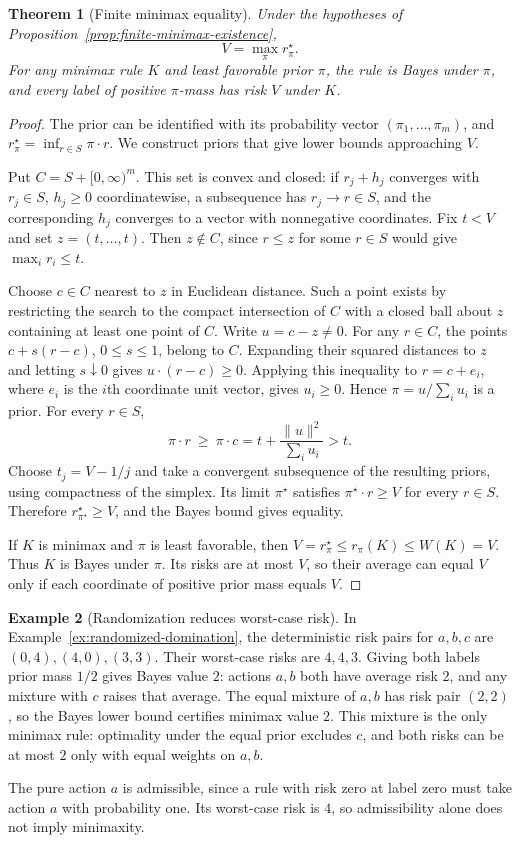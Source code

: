 \documentclass[11pt,oneside]{book}
\newtheorem{theorem}{Theorem}[chapter]
\theoremstyle{definition}
\newtheorem{example}[theorem]{Example}
\theoremstyle{remark}
\begin{document}
\begin{theorem}[Finite minimax equality]
\label{thm:finite-minimax-equality}
Under the hypotheses of Proposition~\ref{prop:finite-minimax-existence},
\[
V=\max_{\pi}r_\pi^\star.
\]
For any minimax rule $K$ and least favorable prior $\pi$, the rule is
Bayes under $\pi$, and every label of positive $\pi$-mass has risk $V$
under $K$.
\end{theorem}
\begin{proof}
The prior can be identified with its probability vector
$(\pi_1,\ldots,\pi_m)$, and $r_\pi^\star=\inf_{r\in S}\pi\cdot r$.
We construct priors that give lower bounds approaching $V$.

Put $C=S+[0,\infty)^m$. This set is convex and closed: if
$r_j+h_j$ converges with $r_j\in S$, $h_j\geq0$ coordinatewise,
a subsequence has $r_j\to r\in S$, and the corresponding $h_j$
converges to a vector with nonnegative coordinates. Fix $t<V$ and
set $z=(t,\ldots,t)$. Then $z\notin C$, since $r\leq z$ for some
$r\in S$ would give $\max_i r_i\leq t$.

Choose $c\in C$ nearest to $z$ in Euclidean distance. Such a point
exists by restricting the search to the compact intersection of
$C$ with a closed ball about $z$ containing at least one point of $C$.
Write $u=c-z\ne0$. For any $r\in C$, the points
$c+s(r-c)$, $0\leq s\leq1$, belong to $C$. Expanding their squared
distances to $z$ and letting $s\downarrow0$ gives
$u\cdot(r-c)\geq0$. Applying this inequality to $r=c+e_i$, where
$e_i$ is the $i$th coordinate unit vector, gives $u_i\geq0$.
Hence $\pi=u/\sum_i u_i$ is a prior. For every $r\in S$,
\[
\pi\cdot r\ \geq\ \pi\cdot c
=t+\frac{\|u\|^2}{\sum_i u_i}>t.
\]
Choose $t_j=V-1/j$ and take a convergent subsequence of the resulting
priors, using compactness of the simplex. Its limit $\pi^\star$
satisfies $\pi^\star\cdot r\geq V$ for every $r\in S$. Therefore
$r_{\pi^\star}^\star\geq V$, and the Bayes bound gives equality.

If $K$ is minimax and $\pi$ is least favorable, then
$V=r_\pi^\star\leq r_\pi(K)\leq W(K)=V$. Thus $K$ is Bayes under
$\pi$. Its risks are at most $V$, so their average can equal $V$
only if each coordinate of positive prior mass equals $V$.
\end{proof}

\begin{example}[Randomization reduces worst-case risk]
\label{ex:finite-randomized-minimax}
In Example~\ref{ex:randomized-domination}, the deterministic risk
pairs for $a,b,c$ are $(0,4),(4,0),(3,3)$. Their worst-case risks
are $4,4,3$. Giving both labels prior mass $1/2$ gives Bayes value
$2$: actions $a,b$ both have average risk $2$, and any mixture
with $c$ raises that average. The equal mixture of $a,b$ has risk
pair $(2,2)$, so the Bayes lower bound certifies minimax value $2$.
This mixture is the only minimax rule: optimality under the equal
prior excludes $c$, and both risks can be at most $2$ only with
equal weights on $a,b$.

The pure action $a$ is admissible, since a rule with risk zero at
label zero must take action $a$ with probability one. Its worst-case
risk is $4$, so admissibility alone does not imply minimaxity.
\end{example}
\end{document}
